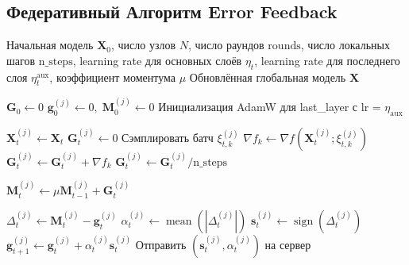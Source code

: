 \documentclass{article}
\begin{document}
\subsection{Федеративный Алгоритм Error Feedback}\label{app:ef21_alg}
\begin{algorithm}[H]
\caption{Federated EF21-Muon}
\begin{algorithmic}[1]
\Require Начальная модель $\mathbf{X}_0$, число узлов $N$, число раундов $\mathrm{rounds}$, число локальных шагов $\mathrm{n\_steps}$, learning rate для основных слоёв $\eta_t$, learning rate для последнего слоя $\eta_t^{\text{aux}}$, коэффициент моментума $\mu$
\Ensure Обновлённая глобальная модель $\mathbf{X}$

\State $\mathbf{G}_0 \gets 0$ 
    \State $\mathbf{g}_0^{(j)} \gets 0, \; \mathbf{M}_0^{(j)} \gets 0$ 
\EndFor
\State Инициализация AdamW для last\_layer с lr = $\eta_{\mathrm{aux}}$

     
        \State $\mathbf{X}_t^{(j)} \gets \mathbf{X}_t$ 
        \State $\mathbf{G}_t^{(j)} \gets 0$
            \State Сэмплировать батч $\xi_{t,k}^{(j)}$
            \State $\nabla f_k \gets \nabla f(\mathbf{X}_t^{(j)}; \xi_{t,k}^{(j)})$
            \State $\mathbf{G}_t^{(j)} \gets \mathbf{G}_t^{(j)} + \nabla f_k$
        \EndFor
        \State $\mathbf{G}_t^{(j)} \gets \mathbf{G}_t^{(j)} / \mathrm{n\_steps}$ 
        
        \State $\mathbf{M}_t^{(j)} \gets \mu \mathbf{M}_{t-1}^{(j)} + \mathbf{G}_t^{(j)}$ 
        
            \State $\Delta_t^{(j)} \gets \mathbf{M}_t^{(j)} - \mathbf{g}_t^{(j)}$ 
            \State $\alpha_t^{(j)} \gets \operatorname{mean}(|\Delta_t^{(j)}|)$ 
            \State $\mathbf{s}_t^{(j)} \gets \operatorname{sign}(\Delta_t^{(j)})$ 
            \State $\mathbf{g}_{t+1}^{(j)} \gets \mathbf{g}_t^{(j)} + \alpha_t^{(j)} \mathbf{s}_t^{(j)}$ 
            \State Отправить $(\mathbf{s}_t^{(j)}, \alpha_t^{(j)})$ на сервер
        \EndFor
        

\end{algorithmic}
\end{algorithm}
\end{document}
